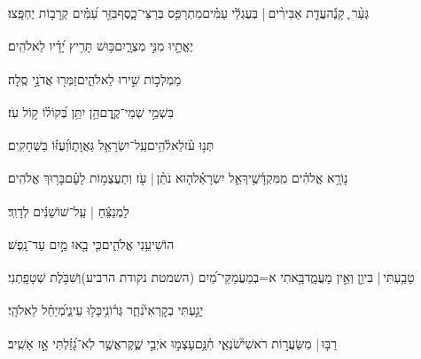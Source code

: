 \documentclass[12pt]{article}
\newcommand{\loc}[1]{\textsuperscript{\locf{#1}}}
\begin{document}
{\loc{ לא}~}‏גְּעַ֨ר ֪ קָנֶ֡ה{\hfill}עֲדַ֤ת אַבִּירִ֨ים |  בְּעֶגְלֵ֬י עַמִּ֗ים\newline\hspace*{.5em}מִתְרַפֵּ֥ס בְּרַצֵּי־כָ֑סֶף{\hfill}בִּזַּ֥ר עַ֝מִּ֗ים קְרָב֥וֹת יֶחְפָּֽצוּ׃\par

{\loc{ לב}~}‏יֶאֱתָ֣יוּ  מִנִּ֣י מִצְרָ֑יִם{\hfill}כּ֥וּשׁ תָּרִ֥יץ יָ֝דָ֗יו לֵאלֹהִֽים׃\par

{\loc{ לג}~}‏מַמְלְכ֣וֹת  שִׁ֣ירוּ לֵאלֹהִ֑ים{\hfill}זַמְּר֖וּ אֲדֹנָ֣י סֶֽלָה׃\par

{\loc{ לד}~}‏ בִּשְׁמֵ֣י שְׁמֵי־קֶ֑דֶם{\hfill}הֵ֥ן יִתֵּ֥ן בְּ֝קוֹל֗וֹ ק֣וֹל עֹֽז׃\par

{\loc{ לה}~}‏תְּנ֥וּ עֹ֗ז{\hfill}לֵאלֹ֫הִ֥ים\newline\hspace*{.5em}עַֽל־יִשְׂרָאֵ֥ל גַּאֲוָת֑וֹ{\hfill}וְ֝עֻזּ֗וֹ בַּשְּׁחָקִֽים׃\par

{\loc{ לו}~}‏נ֤וֹרָ֥א אֱלֹהִ֗ים מִֽמִּקְדָּ֫שֶׁ֥יךָ{\hfill}אֵ֤ל יִשְׂרָאֵ֗ל\newline\hspace*{.5em}ה֤וּא נֹתֵ֨ן |  עֹ֖ז וְתַעֲצֻמ֥וֹת לָעָ֗ם{\hfill}בָּר֥וּךְ אֱלֹהִֽים׃\par\pend
\ledpb
\pstart[\subsection*{\textcolor{red}{פרק סט}}]\label{פרק סט}
{\loc{ א}~}‏לַמְנַצֵּ֬חַ | עַֽל־שׁוֹשַׁנִּ֬ים לְדָוִֽד׃\par

{\loc{ ב}~}‏הוֹשִׁיעֵ֥נִי אֱלֹהִ֑ים{\hfill}כִּ֤י בָ֖אוּ מַ֣יִם עַד־נָֽפֶשׁ׃\par

{\loc{ ג}~}‏טָבַ֤עְתִּי |  בִּיוֵ֣ן  וְאֵ֣ין מָעֳמָ֑ד{\hfill}בָּ֥אתִי א=בְמַעֲמַקֵּי־מַ֝יִם (השמטת נקודת הרביע){\hfill}וְשִׁבֹּ֥לֶת שְׁטָפָֽתְנִי׃\par

{\loc{ ד}~}‏יָגַ֣עְתִּי בְקׇרְאִי֮{\hfill}נִחַ֢ר גְּר֫וֹנִ֥י\newline\hspace*{.5em}כָּל֥וּ עֵינַ֑י{\hfill}מְ֝יַחֵ֗ל לֵאלֹהָֽי׃\par

{\loc{ ה}~}‏רַבּ֤וּ |  מִשַּׂעֲר֣וֹת רֹאשִׁי֮{\hfill}שֹׂנְאַ֢י חִ֫נָּ֥ם\newline\hspace*{.5em}עָצְמ֣וּ  אֹיְבַ֣י שֶׁ֑קֶר{\hfill}אֲשֶׁ֥ר לֹֽא־גָ֝זַ֗לְתִּי אָ֣ז אָשִֽׁיב׃\par
\end{document}
